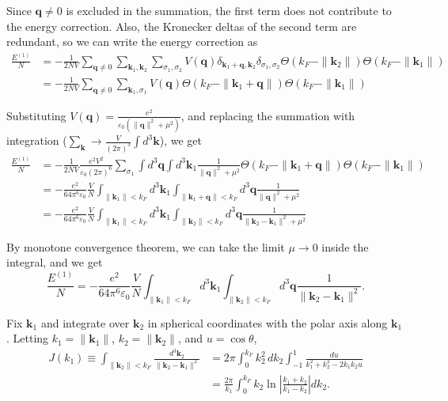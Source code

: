 \documentclass[a4paper,11pt]{article}
\begin{document}
Since $\mathbf{q} \ne 0$ is excluded in the summation, the first term does not contribute to the energy correction. Also, the Kronecker deltas of the second term are redundant, so we can write the energy correction as
\begin{align}
  \frac{E^{(1)}}{N} 
  &= -\frac{1}{2NV}\sum_{\mathbf{q}\ne 0}\sum_{\mathbf{k}_1, \mathbf{k}_2}\sum_{\sigma_1, \sigma_2} V(\mathbf{q}) \delta_{\mathbf{k}_1 + \mathbf{q}, \mathbf{k}_2} \delta_{\sigma_1, \sigma_2} \Theta(k_F - \|\mathbf{k}_2\|) \Theta(k_F - \|\mathbf{k}_1\|)\\
  &= -\frac{1}{2NV}\sum_{\mathbf{q}\ne 0}\sum_{\mathbf{k}_1, \sigma_1} V(\mathbf{q}) \Theta(k_F - \|\mathbf{k}_1+\mathbf{q}\|) \Theta(k_F - \|\mathbf{k}_1\|)
\end{align}

Substituting $V(\mathbf{q}) = \frac{e^2}{\varepsilon_0(\|\mathbf{q}\|^2 + \mu^2)}$, and replacing the summation with integration ($\sum_{\mathbf{k}} \to \frac{V}{(2\pi)^3}\int d^3\mathbf{k}$), we get
\begin{align}
  \frac{E^{(1)}}{N} 
  &= -\frac{1}{2NV}\frac{e^2V^2}{\varepsilon_0(2\pi)^6}\sum_{\sigma_1} \int d^3\mathbf{q} \int d^3\mathbf{k}_1 \frac{1}{\|\mathbf{q}\|^2 + \mu^2} \Theta(k_F - \|\mathbf{k}_1+\mathbf{q}\|) \Theta(k_F - \|\mathbf{k}_1\|)\\
  &= -\frac{e^2}{64\pi^6\varepsilon_0}\frac{V}{N}\int_{\|\mathbf{k}_1\|<k_F} d^3\mathbf{k}_1 \int_{\|\mathbf{k}_1 + \mathbf{q}\|<k_F} d^3\mathbf{q} \frac{1}{\|\mathbf{q}\|^2 + \mu^2} \\
  &= -\frac{e^2}{64\pi^6\varepsilon_0}\frac{V}{N}\int_{\|\mathbf{k}_1\|<k_F} d^3\mathbf{k}_1 \int_{\|\mathbf{k}_2\|<k_F} d^3\mathbf{q} \frac{1}{\|\mathbf{k}_2-\mathbf{k}_1\|^2 + \mu^2} 
\end{align}

By monotone convergence theorem, we can take the limit $\mu \to 0$ inside the integral, and we get
\begin{equation}
  \frac{E^{(1)}}{N} = -\frac{e^2}{64\pi^6\varepsilon_0}\frac{V}{N}\int_{\|\mathbf{k}_1\|<k_F} d^3\mathbf{k}_1 \int_{\|\mathbf{k}_2\|<k_F} d^3\mathbf{q} \frac{1}{\|\mathbf{k}_2-\mathbf{k}_1\|^2}.
\end{equation}


Fix $\mathbf{k}_1$ and integrate over $\mathbf{k}_2$ in spherical coordinates with the polar axis along $\mathbf{k}_1$.  Letting $k_1 = \|\mathbf{k}_1\|$, $k_2 = \|\mathbf{k}_2\|$, and $u = \cos\theta$,
\begin{align}
  J(k_1) \equiv \int_{\|\mathbf{k}_2\|<k_F}\!\!\frac{d^3\mathbf{k}_2}{\|\mathbf{k}_2-\mathbf{k}_1\|^2}
  &= 2\pi\!\int_0^{k_F}\!\! k_2^2\, dk_2 \int_{-1}^1 \frac{du}{k_1^2 + k_2^2 - 2 k_1 k_2 u} \\
  &= \frac{2\pi}{k_1}\!\int_0^{k_F}\!\! k_2 \ln\!\left|\frac{k_1+k_2}{k_1-k_2}\right| dk_2.
\end{align}
\end{document}
